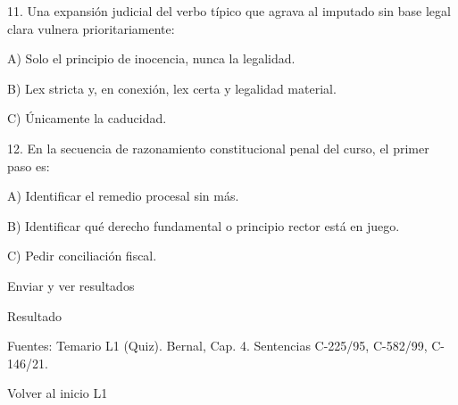 \documentclass[11pt,a4paper]{article}
\begin{document}
        11. Una expansión judicial del verbo típico que agrava al imputado sin base legal clara vulnera prioritariamente:\par

         A) Solo el principio de inocencia, nunca la legalidad.\par
         B) Lex stricta y, en conexión, lex certa y legalidad material.\par
         C) Únicamente la caducidad.\par



        12. En la secuencia de razonamiento constitucional penal del curso, el primer paso es:\par

         A) Identificar el remedio procesal sin más.\par
         B) Identificar qué derecho fundamental o principio rector está en juego.\par
         C) Pedir conciliación fiscal.\par


      Enviar y ver resultados\par



      Resultado\par










      Fuentes: Temario L1 (Quiz). Bernal, Cap. 4. Sentencias C-225/95, C-582/99, C-146/21.\par


    Volver al inicio L1\par
\end{document}
